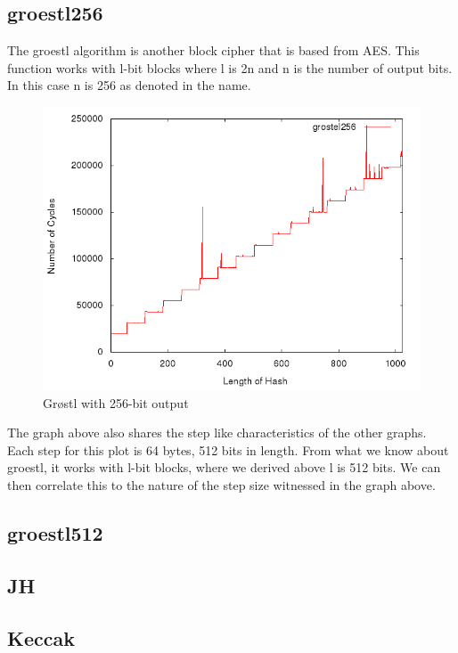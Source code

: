 \documentclass[10pt,a4paper]{article}
\begin{document}
\subsection{groestl256}
The groestl algorithm is another block cipher that is based from AES. This function works with l-bit blocks where l is 2n and n is the number of output bits. In this case n is 256 as denoted in the name. 
    \begin{figure}[H]
        \begin{center}
            \includegraphics[scale=0.5]{images/grostel256.png} 
            \caption{Gr{\o}stl with 256-bit output}
        \end{center}
    \end{figure}
The graph above also shares the step like characteristics of the other graphs. Each step for this plot is 64 bytes, 512 bits in length. From what we know about groestl, it works with l-bit blocks, where we derived above l is 512 bits. We can then correlate this to the nature of the step size witnessed in the graph above.


\subsection{groestl512}

\subsection{JH}

\subsection{Keccak}

\end{document}
